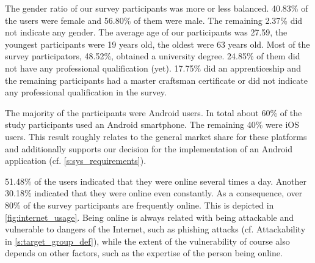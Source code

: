 \begin{description}[leftmargin=0cm]
	\item[General Information:] The gender ratio of our survey participants was more or less balanced.
 40.83\% of the users were female and 56.80\% of them were male.
 The remaining 2.37\% did not indicate any gender.
 The average age of our participants was 27.59, the youngest participants were 19 years old, the oldest were 63 years old.
 Most of the survey participators, 48.52\%, obtained a university degree.
 24.85\% of them did not have any professional qualification (yet). 17.75\% did an apprenticeship and the remaining participants had a master craftsman certificate or did not indicate any professional qualification in the survey.
	
	\item[High Rate of Android Users:] The majority of the participants were Android users.
 In total about 60\% of the study participants used an Android smartphone.
 The remaining 40\% were iOS users.
 This result roughly relates to the general market share for these platforms and additionally supports our decision for the implementation of an Android application (cf. \autoref{s:sys_requirements}).

	\item[High Internet Usage Frequency:] 51.48\% of the users indicated that they were online several times a day.
 Another 30.18\% indicated that they were online even constantly.
 As a consequence, over 80\% of the survey participants are frequently online.
 This is depicted in \autoref{fig:internet_usage}. Being online is always related with being attackable and vulnerable to dangers of the Internet, such as phishing attacks (cf. Attackability in \autoref{s:target_group_def}), while the extent of the vulnerability of course also depends on other factors, such as the expertise of the person being online.
	

\end{description}
